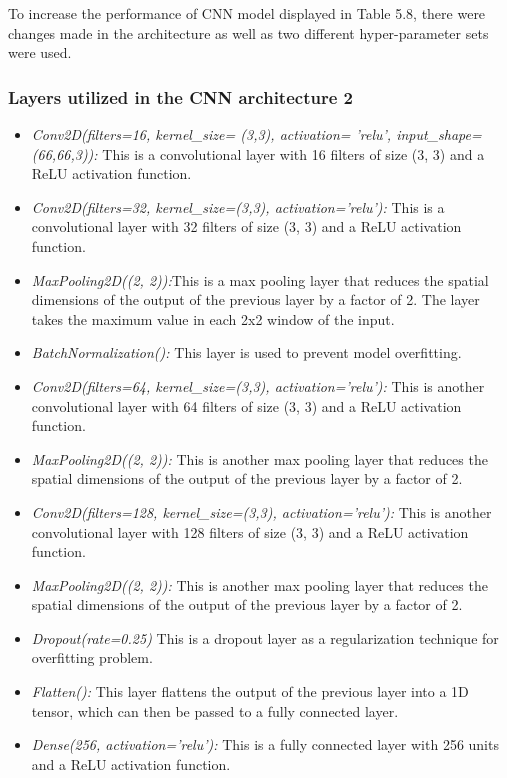 To increase the performance of CNN model displayed in Table 5.8, there were changes made in the architecture as well as two different hyper-parameter sets were used. 

\subsubsection{Layers utilized in the CNN architecture 2}
\begin{itemize}
    \item \textit{Conv2D(filters=16, kernel_size= (3,3), activation= 'relu', input_shape=(66,66,3)):} This is a convolutional layer with 16 filters of size (3, 3) and a ReLU activation function.
    \item \textit{Conv2D(filters=32, kernel_size=(3,3), activation='relu'):} This is a convolutional layer with 32 filters of size (3, 3) and a ReLU activation function.
    \item \textit{MaxPooling2D((2, 2)):}This is a max pooling layer that reduces the spatial dimensions of the output of the previous layer by a factor of 2. The layer takes the maximum value in each 2x2 window of the input.
    \item \textit{BatchNormalization():} This layer is used to prevent model overfitting.
    \item \textit{Conv2D(filters=64, kernel_size=(3,3), activation='relu'):} This is another convolutional layer with 64 filters of size (3, 3) and a ReLU activation function.
    \item \textit{MaxPooling2D((2, 2)):}  This is another max pooling layer that reduces the spatial dimensions of the output of the previous layer by a factor of 2.
    \item \textit{Conv2D(filters=128, kernel_size=(3,3), activation='relu'):} This is another convolutional layer with 128 filters of size (3, 3) and a ReLU activation function.
    \item \textit{MaxPooling2D((2, 2)):}  This is another max pooling layer that reduces the spatial dimensions of the output of the previous layer by a factor of 2.
    \item \textit{Dropout(rate=0.25)}  This is a dropout layer as a regularization technique for overfitting problem.
    \item \textit{Flatten():} This layer flattens the output of the previous layer into a 1D tensor, which can then be passed to a fully connected layer.
    \item \textit{Dense(256, activation='relu'):}  This is a fully connected layer with 256 units and a ReLU activation function.

\end{itemize}
